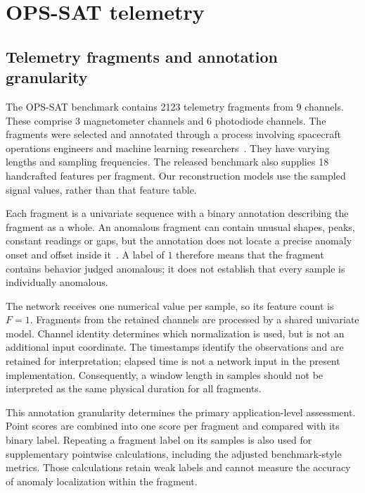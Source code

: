 \section{OPS-SAT telemetry}
\label{sec:datasets-opssat}
\subsection{Telemetry fragments and annotation granularity}
\label{sec:datasets-opssat-labels}
The \ac{OPS-SAT} benchmark contains \num{2123} telemetry fragments from
\num{9} channels. These comprise \num{3} magnetometer channels and \num{6}
photodiode channels. The fragments were selected and annotated through a
process involving spacecraft operations engineers and machine learning
researchers~\cite{Ruszczak2025OPSSAT}. They have varying lengths and sampling
frequencies. The released benchmark also supplies \num{18} handcrafted
features per fragment. Our reconstruction models use the sampled signal
values, rather than that feature table.

Each fragment is a univariate sequence with a binary annotation describing
the fragment as a whole. An anomalous fragment can contain unusual shapes,
peaks, constant readings or gaps, but the annotation does not locate a precise
anomaly onset and offset inside it~\cite{Ruszczak2025OPSSAT}. A label of
\(1\) therefore means that the fragment contains behavior judged anomalous;
it does not establish that every sample is individually anomalous.

The network receives one numerical value per sample, so its feature count is
\(F=1\). Fragments from the retained channels are processed by a shared
univariate model. Channel identity determines which normalization is used,
but is not an additional input coordinate. The timestamps identify the
observations and are retained for interpretation; elapsed time is not a
network input in the present implementation. Consequently, a window length
in samples should not be interpreted as the same physical duration for all
fragments.

This annotation granularity determines the primary application-level
assessment. Point scores are combined into one score per fragment and compared
with its binary label. Repeating a fragment label on its samples is also
used for supplementary pointwise calculations, including the adjusted
benchmark-style metrics. Those calculations retain weak labels and cannot
measure the accuracy of anomaly localization within the fragment.

